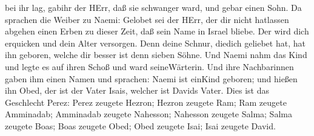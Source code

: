 bei ihr lag, gabihr der HErr, daß sie schwanger ward, und gebar einen
Sohn.  Da sprachen die Weiber zu Naemi: Gelobet sei der
HErr, der dir nicht hatlassen abgehen einen Erben zu dieser Zeit, daß
sein Name in Israel bliebe.  Der wird dich erquicken und
dein Alter versorgen. Denn deine Schnur, diedich geliebet hat, hat ihn
geboren, welche dir besser ist denn sieben Söhne.  Und
Naemi nahm das Kind und legte es auf ihren Schoß und ward seineWärterin.
 Und ihre Nachbarinnen gaben ihm einen Namen und sprachen:
Naemi ist einKind geboren; und hießen ihn Obed, der ist der Vater Isais,
welcher ist Davids Vater.  Dies ist das Geschlecht Perez:
Perez zeugete Hezron;  Hezron zeugete Ram; Ram zeugete
Amminadab;  Amminadab zeugete Nahesson; Nahesson zeugete
Salma;  Salma zeugete Boas; Boas zeugete Obed;
 Obed zeugete Isai; Isai zeugete David.

